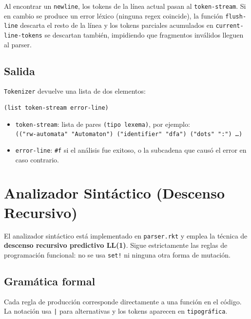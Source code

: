 \documentclass{article}
\begin{document}
Al encontrar un \texttt{newline}, los tokens de la línea actual pasan al
\texttt{token-stream}.
Si en cambio se produce un error léxico (ninguna regex coincide), la función
\texttt{flush-line} descarta el resto de la línea y los tokens parciales acumulados
en \texttt{current-line-tokens} se descartan también, impidiendo que fragmentos
inválidos lleguen al parser.

\subsection{Salida}

\texttt{Tokenizer} devuelve una lista de dos elementos:

\begin{verbatim}
(list token-stream error-line)
\end{verbatim}

\begin{itemize}
  \item \texttt{token-stream}: lista de pares \texttt{(tipo lexema)}, por ejemplo:\\
        \texttt{(("rw-automata" "Automaton") ("identifier" "dfa") ("dots" ":") \ldots)}
  \item \texttt{error-line}: \texttt{\#f} si el análisis fue exitoso, o la subcadena
        que causó el error en caso contrario.
\end{itemize}

\section{Analizador Sintáctico (Descenso Recursivo)}

El analizador sintáctico está implementado en \texttt{parser.rkt} y emplea la técnica
de \textbf{descenso recursivo predictivo LL(1)}.
Sigue estrictamente las reglas de programación funcional: no se usa \texttt{set!}
ni ninguna otra forma de mutación.

\subsection{Gramática formal}

Cada regla de producción corresponde directamente a una función en el código.
La notación usa \texttt{|} para alternativas y los tokens aparecen en
\texttt{tipográfica}.
\end{document}
